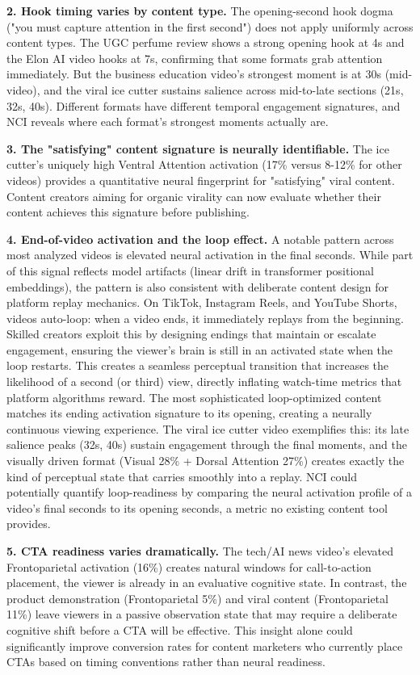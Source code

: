 \documentclass[11pt,letterpaper]{article}
\begin{document}
\textbf{2. Hook timing varies by content type.} The opening-second hook dogma ("you must capture attention in the first second") does not apply uniformly across content types. The UGC perfume review shows a strong opening hook at 4s and the Elon AI video hooks at 7s, confirming that some formats grab attention immediately. But the business education video's strongest moment is at 30s (mid-video), and the viral ice cutter sustains salience across mid-to-late sections (21s, 32s, 40s). Different formats have different temporal engagement signatures, and NCI reveals where each format's strongest moments actually are.

\textbf{3. The "satisfying" content signature is neurally identifiable.} The ice cutter's uniquely high Ventral Attention activation (17\% versus 8-12\% for other videos) provides a quantitative neural fingerprint for "satisfying" viral content. Content creators aiming for organic virality can now evaluate whether their content achieves this signature before publishing.

\textbf{4. End-of-video activation and the loop effect.} A notable pattern across most analyzed videos is elevated neural activation in the final seconds. While part of this signal reflects model artifacts (linear drift in transformer positional embeddings), the pattern is also consistent with deliberate content design for platform replay mechanics. On TikTok, Instagram Reels, and YouTube Shorts, videos auto-loop: when a video ends, it immediately replays from the beginning. Skilled creators exploit this by designing endings that maintain or escalate engagement, ensuring the viewer's brain is still in an activated state when the loop restarts. This creates a seamless perceptual transition that increases the likelihood of a second (or third) view, directly inflating watch-time metrics that platform algorithms reward. The most sophisticated loop-optimized content matches its ending activation signature to its opening, creating a neurally continuous viewing experience. The viral ice cutter video exemplifies this: its late salience peaks (32s, 40s) sustain engagement through the final moments, and the visually driven format (Visual 28\% + Dorsal Attention 27\%) creates exactly the kind of perceptual state that carries smoothly into a replay. NCI could potentially quantify loop-readiness by comparing the neural activation profile of a video's final seconds to its opening seconds, a metric no existing content tool provides.

\textbf{5. CTA readiness varies dramatically.} The tech/AI news video's elevated Frontoparietal activation (16\%) creates natural windows for call-to-action placement, the viewer is already in an evaluative cognitive state. In contrast, the product demonstration (Frontoparietal 5\%) and viral content (Frontoparietal 11\%) leave viewers in a passive observation state that may require a deliberate cognitive shift before a CTA will be effective. This insight alone could significantly improve conversion rates for content marketers who currently place CTAs based on timing conventions rather than neural readiness.
\end{document}
